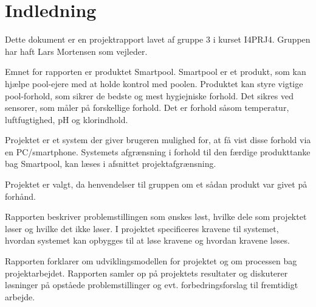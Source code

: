 \chapter{Indledning}






Dette dokument er en projektrapport lavet af gruppe 3 i kurset I4PRJ4. Gruppen har haft Lars Mortensen som vejleder. 

Emnet for rapporten er produktet Smartpool. Smartpool er et produkt, som kan hjælpe pool-ejere med at holde kontrol med poolen. Produktet kan styre vigtige pool-forhold, som sikrer de bedste og mest hygiejniske forhold. Det sikres ved sensorer, som måler på forskellige forhold. Det er forhold såsom temperatur, luftfugtighed, pH og klorindhold. 

Projektet er et system der giver brugeren mulighed for, at få vist disse forhold via en PC/smartphone. Systemets afgrænsning i forhold til den færdige produkttanke bag Smartpool, kan læses i afsnittet projektafgrænsning.

Projektet er valgt, da henvendelser til gruppen om et sådan produkt var givet på forhånd. 

Rapporten beskriver problemstillingen som ønskes løst, hvilke dele som projektet løser og hvilke det ikke løser. I projektet specificeres kravene til systemet, hvordan systemet kan opbygges til at løse kravene og hvordan kravene løses. 

Rapporten forklarer om udviklingsmodellen for projektet og om processen bag projektarbejdet. Rapporten samler op på projektets resultater og diskuterer løsninger på opståede problemstillinger og evt. forbedringsforslag til fremtidigt arbejde. 